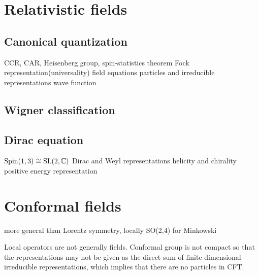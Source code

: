 \documentclass{../../large}
\begin{document}
\chapter{Relativistic fields}
\section{Canonical quantization}
CCR, CAR, Heisenberg group, spin-statistics theorem
Fock representation(universality)
field equations
particles and irreducible representations
wave function








\section{Wigner classification}
\section{Dirac equation}
$\mathrm{Spin}(1,3)\cong\mathrm{SL}(2,\mathbb{C})$
Dirac and Weyl representations
helicity and chirality
positive energy representation







\chapter{Conformal fields}
more general than Lorentz symmetry, locally SO(2,4) for Minkowski

Local operators are not generally fields.
Conformal group is not compact so that the representations may not be given as the direct sum of finite dimensional irreducible representations, which implies that there are no particles in CFT.





\section{}
\end{document}
